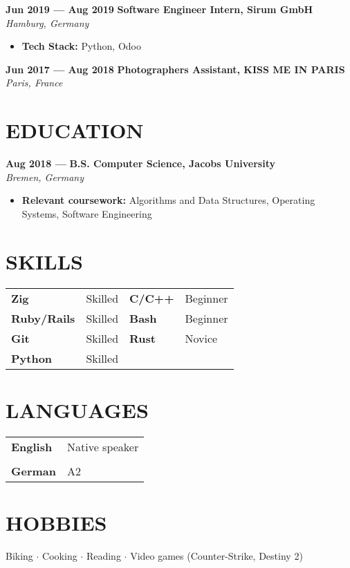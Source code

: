 \documentclass[11pt,a4paper]{article}
\newcommand{\resumesection}[1]{
  \section*{\textcolor{sectioncolor}{\MakeUppercase{#1}}}
}
\newcommand{\skill}[2]{
  \textbf{#1} & #2 \\
}
\newcommand{\job}[4]{
  \textbf{#1 — #2} \hfill \textbf{#3} \\
  \textit{#4}
}
\begin{document}
\job{Jun 2019} {Aug 2019} {Software Engineer Intern, Sirum GmbH} {Hamburg, Germany}
\begin{itemize}[leftmargin=*,label=$\bullet$,itemsep=0.3ex]
    \item \textbf{Tech Stack:} Python, Odoo
\end{itemize}

\job{Jun 2017} {Aug 2018} {Photographers Assistant, KISS ME IN PARIS} {Paris, France}

\resumesection{Education}
\job{Aug 2018} {} {B.S. Computer Science, Jacobs University} {Bremen, Germany}
\begin{itemize}[leftmargin=*,itemsep=0.3ex]
  \item \textbf{Relevant coursework:} Algorithms and Data Structures, Operating Systems, Software Engineering
\end{itemize}

\resumesection{Skills}
\begin{tabular}{p{}p{}p{}p{}}
  \textbf{Zig} & Skilled & \textbf{C/C++} & Beginner \\
  \textbf{Ruby/Rails} & Skilled & \textbf{Bash} & Beginner \\
  \textbf{Git} & Skilled & \textbf{Rust} & Novice \\
  \textbf{Python} & Skilled & \\
\end{tabular}

\resumesection{Languages}
\begin{tabular}{ll}
  \skill{English} {Native speaker} \\
  \skill{German} {A2}
\end{tabular}

\resumesection{Hobbies}
Biking $\cdot$
Cooking $\cdot$
Reading $\cdot$
Video games (Counter-Strike, Destiny 2)
\end{document}
